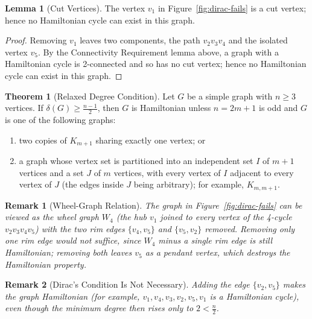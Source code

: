 \documentclass{article}
\newtheorem{remark}{Remark}
\theoremstyle{definition}
\newtheorem{theorem}{Theorem}
\newtheorem{lemma}{Lemma}
\begin{document}
\begin{lemma}[Cut Vertices]
The vertex $v_1$ in Figure~\ref{fig:dirac-fails} is a cut vertex; hence no Hamiltonian cycle can exist in this graph.
\end{lemma}

\begin{proof}
Removing $v_1$ leaves two components, the path $v_2v_3v_4$ and the isolated vertex $v_5$. By the Connectivity Requirement lemma above, a graph with a Hamiltonian cycle is 2-connected and so has no cut vertex; hence no Hamiltonian cycle can exist in this graph.
\end{proof}

\begin{theorem}[Relaxed Degree Condition]
Let $G$ be a simple graph with $n \geq 3$ vertices. If $\delta(G) \geq \frac{n-1}{2}$, then $G$ is Hamiltonian unless $n = 2m+1$ is odd and $G$ is one of the following graphs:
\begin{enumerate}
    \item two copies of $K_{m+1}$ sharing exactly one vertex; or
    \item a graph whose vertex set is partitioned into an independent set $I$ of $m+1$ vertices and a set $J$ of $m$ vertices, with every vertex of $I$ adjacent to every vertex of $J$ (the edges inside $J$ being arbitrary); for example, $K_{m,m+1}$.
\end{enumerate}
\end{theorem}

\begin{remark}[Wheel-Graph Relation]
The graph in Figure~\ref{fig:dirac-fails} can be viewed as the wheel graph $W_4$ (the hub $v_1$ joined to every vertex of the 4-cycle $v_2v_3v_4v_5$) with the two rim edges $\{v_4,v_5\}$ and $\{v_5,v_2\}$ removed. Removing only one rim edge would not suffice, since $W_4$ minus a single rim edge is still Hamiltonian; removing both leaves $v_5$ as a pendant vertex, which destroys the Hamiltonian property.
\end{remark}

\begin{remark}[Dirac's Condition Is Not Necessary]
Adding the edge $\{v_2,v_5\}$ makes the graph Hamiltonian (for example, $v_1, v_4, v_3, v_2, v_5, v_1$ is a Hamiltonian cycle), even though the minimum degree then rises only to $2 < \frac{n}{2}$.
\end{remark}
\end{document}
